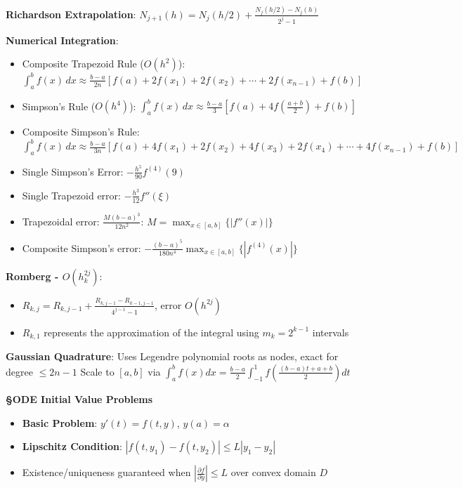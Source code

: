 \documentclass{article}
\begin{document}
\begin{minipage}[t]{0.49\textwidth}
\textbf{Richardson Extrapolation}: $N_{j+1}(h) = N_j(h/2) + \frac{N_j(h/2) - N_j(h)}{2^{j}-1}$

\textbf{Numerical Integration}:
\begin{itemize}\setlength{\itemsep}{-1pt}
\item Composite Trapezoid Rule ($O(h^2)$): \\$\int_a^b f(x)\,dx \approx \frac{b-a}{2n}[f(a) +2f(x_1) + 2f(x_2)+\cdots+2f(x_{n-1}) + f(b)]$
\item Simpson's Rule ($O(h^4)$): $\int_a^b f(x)\,dx \approx \frac{b-a}{3}\left[f(a) + 4f\left(\frac{a+b}{2}\right) + f(b)\right]$
\item Composite Simpson's Rule:\\ $\int_a^b f(x)\,dx \approx \frac{b-a}{3n}\left[f(a) + 4f(x_1) + 2f(x_2) + 4f(x_3) + 2f(x_4) + \cdots + 4f(x_{n-1}) + f(b)\right]$
\item Single Simpson's Error: $-\frac{h^5}{90}f^{(4)}(9)$
\item Single Trapezoid error: $-\frac{h^3}{12}f''(\xi)$  
\item Trapezoidal error: $\frac{M(b-a)^3}{12n^2}$: $M=\max_{x\in[a,b]}\{|f''(x)|\}$
\item Composite Simpson's error: $-\frac{(b-a)^5}{180n^4}\max_{x\in[a,b]}\{|f^{(4)}(x)|\}$
\end{itemize}

\textbf{Romberg - $O(h_k^{2j})$}: \\
\begin{itemize}
    \item{$R_{k,j} = R_{k,j-1} + \frac{R_{k,j-1} - R_{k-1,j-1}}{4^{j-1}-1}$, error $O(h^{2j})$}
    \item{$R_{k,1}$ represents the approximation of the integral using $m_k=2^{k-1}$ intervals}
\end{itemize}

\textbf{Gaussian Quadrature}: Uses Legendre polynomial roots as nodes, exact for degree $\leq 2n-1$
Scale to $[a,b]$ via $\int_a^b f(x)dx = \frac{b-a}{2}\int_{-1}^1 f\left(\frac{(b-a)t + a + b}{2}\right)dt$

\textbf{\S ODE Initial Value Problems}
\begin{itemize}
\item \textbf{Basic Problem}: $y'(t) = f(t,y)$, $y(a) = \alpha$
\item \textbf{Lipschitz Condition}: $|f(t,y_1) - f(t,y_2)| \leq L|y_1 - y_2|$ 
\item Existence/uniqueness guaranteed when $|\frac{\partial f}{\partial y}| \leq L$ over convex domain $D$
\end{itemize}


\end{minipage}
\end{document}
